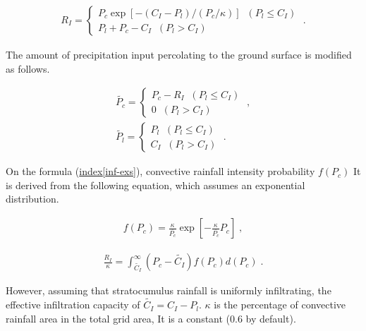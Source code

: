 \begin{eqnarray}
  R_I = \left\{
    \begin{array}{ll}
       P_c \exp [ -(C_I-P_l) / (P_c/\kappa) ]  \;\; ( P_l \le C_I ) \\
       P_l + P_c - C_I                         \;\; ( P_l > C_I ) 
    \end{array}
  \right. \; .
\end{eqnarray}

\begin{quote}
\protect\hypertarget{inf-exs}{}{}
\end{quote}

The amount of precipitation input percolating to the ground surface is
modified as follows.

\begin{eqnarray}
  \widetilde{P_c} = \left\{
    \begin{array}{ll}
      P_c - R_I  \;\; ( P_l \le C_I ) \\
      0             \;\; ( P_l > C_I )
    \end{array}
  \right. \; , \\
  \widetilde{P_l} = \left\{
    \begin{array}{ll}
      P_l   \;\; ( P_l \le C_I ) \\
      C_I  \;\; ( P_l > C_I )
    \end{array}
  \right. \; .
\end{eqnarray}

On the formula (\protect\hyperlink{inf-exs}{index{[}inf-exs{]}}),
convective rainfall intensity probability \(f(P_c)\) It is derived from
the following equation, which assumes an exponential distribution.

\begin{eqnarray}
  f(P_c) = \frac{\kappa}{\overline{P_c}} 
            \exp\left[-\frac{\kappa}{\overline{P_c}}P_c\right] \; ,
\end{eqnarray}

\begin{eqnarray}
  \frac{R_I}{\kappa} = \int_{\widetilde{C_I}}^{\infty}
                        (P_c-\widetilde{C_I})f(P_c) d(P_c) \; .
\end{eqnarray}

However, assuming that stratocumulus rainfall is uniformly infiltrating,
the effective infiltration capacity of \(\widetilde{C_I} = C_I - P_l\).
\(\kappa\) is the percentage of convective rainfall area in the total
grid area, It is a constant (0.6 by default).


